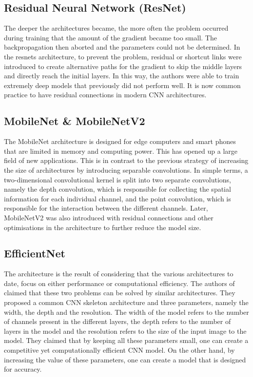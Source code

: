 {\subsection{Residual Neural Network (ResNet)}

The deeper the architectures became, the more often the problem occurred during training that the amount of the gradient became too small. The backpropagation then aborted and the parameters could not be determined. In the \ac{resnets} architecture, to prevent the problem, residual or shortcut links were introduced to create alternative paths for the gradient to skip the middle layers and directly reach the initial layers. In this way, the authors were able to train extremely deep models that previously did not perform well. It is now common practice to have residual connections in modern CNN architectures. \cite{He:2016}




\subsection{MobileNet \& MobileNetV2} %

The MobileNet architecture is designed for edge computers and smart phones that are limited in memory and computing power. This has opened up a large field of new applications. This is in contrast to the previous strategy of increasing the size of architectures by introducing separable convolutions. In simple terms, a two-dimensional convolutional kernel is split into two separate convolutions, namely the depth convolution, which is responsible for collecting the spatial information for each individual channel, and the point convolution, which is responsible for the interaction between the different channels. Later, MobileNetV2 was also introduced with residual connections and other optimisations in the architecture to further reduce the model size. \cite{Howard:2017,MobileNet:2018}

\subsection{EfficientNet} %

The architecture is the result of considering that the various architectures to date, focus on either performance or computational efficiency. The authors of \cite{Tan:2020} claimed that these two problems can be solved by similar architectures. They proposed a common CNN skeleton architecture and three parameters, namely the width, the depth and the resolution. The width of the model refers to the number of channels present in the different layers, the depth refers to the number of layers in the model and the resolution refers to the size of the input image to the model. They claimed that by keeping all these parameters small, one can create a competitive yet computationally efficient CNN model. On the other hand, by increasing the value of these parameters, one can create a model that is designed for accuracy.

}
